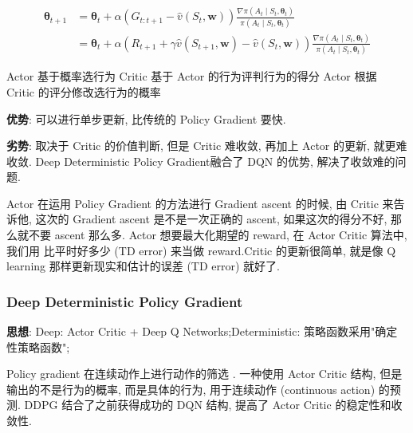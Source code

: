 \documentclass{article}
\begin{document}
            \begin{align*}
                \boldsymbol{\theta}_{t+1} 
                &= \boldsymbol{\theta}_{t}+\alpha\left(G_{t: t+1}-\hat{v}\left(S_{t}, \mathbf{w}\right)\right) \frac{\nabla \pi\left(A_{t} \mid S_{t}, \boldsymbol{\theta}_{t}\right)}{\pi\left(A_{t} \mid S_{t}, \boldsymbol{\theta}_{t}\right)} \\
                &= \boldsymbol{\theta}_{t}+\alpha\left(R_{t+1}+\gamma \hat{v}\left(S_{t+1}, \mathbf{w}\right)-\hat{v}\left(S_{t}, \mathbf{w}\right)\right) \frac{\nabla \pi\left(A_{t} \mid S_{t}, \boldsymbol{\theta}_{t}\right)}{\pi\left(A_{t} \mid S_{t}, \boldsymbol{\theta}_{t}\right)} 
            \end{align*}
            
            Actor 基于概率选行为
            Critic 基于 Actor 的行为评判行为的得分
            Actor 根据 Critic 的评分修改选行为的概率
            
            \textbf{优势}: 可以进行单步更新, 比传统的 Policy Gradient 要快.
            
            \textbf{劣势}: 取决于 Critic 的价值判断, 但是 Critic 难收敛, 再加上 Actor 的更新, 就更难收敛. Deep Deterministic Policy Gradient融合了 DQN 的优势, 解决了收敛难的问题. 
            
            Actor 在运用 Policy Gradient 的方法进行 Gradient ascent 的时候, 由 Critic 来告诉他, 这次的 Gradient ascent 是不是一次正确的 ascent, 如果这次的得分不好, 那么就不要 ascent 那么多. Actor 想要最大化期望的 reward, 在 Actor Critic 算法中, 我们用 比平时好多少 (TD error) 来当做 reward.Critic 的更新很简单, 就是像 Q learning 那样更新现实和估计的误差 (TD error) 就好了.
            
        \subsubsection{Deep Deterministic Policy Gradient}
            \textbf{思想}: Deep: Actor Critic + Deep Q Networks;\quad Deterministic: 策略函数采用"确定性策略函数";
            
            Policy gradient 在连续动作上进行动作的筛选 . 一种使用 Actor Critic 结构, 但是输出的不是行为的概率, 而是具体的行为, 用于连续动作 (continuous action) 的预测. DDPG 结合了之前获得成功的 DQN 结构, 提高了 Actor Critic 的稳定性和收敛性.
            
\end{document}

